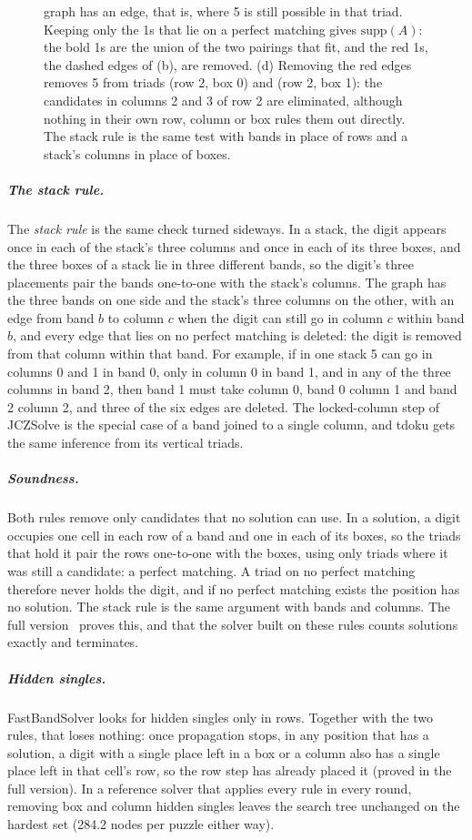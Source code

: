 \documentclass[a4paper,USenglish,cleveref,anonymous]{lipics-v2021}
\newif\ifanon
\newcommand{\selfcite}[1]{\ifanon[anonymized]\else\cite{#1}\fi}
\begin{document}
\begin{figure}[tbp]
{graph has an edge, that is, where 5 is still possible in that triad. Keeping only the 1s that lie on a perfect
matching gives $\mathrm{supp}(A)$: the bold 1s are the union of the two pairings that fit, and the red 1s, the dashed
edges of (b), are removed. (d) Removing the red edges removes 5 from triads (row 2, box 0) and (row 2, box 1): the
candidates in columns 2 and 3 of row 2 are eliminated, although nothing in their own row, column or box rules them
out directly. The stack rule is the same test with bands in place of rows and a stack's
columns in place of boxes.}
\label{fig:band}
\end{figure}

\subparagraph{The stack rule.} The \emph{stack rule} is the same check turned sideways. In a stack, the digit appears once
in each of the stack's three columns and once in each of its three boxes, and the three boxes of a stack lie in three
different bands, so the digit's three placements pair the bands one-to-one with the stack's columns. The graph has the
three bands on one side and the stack's three columns on the other, with an edge from band $b$ to column $c$ when the
digit can still go in column $c$ within band $b$, and every edge that lies on no perfect matching is deleted: the digit
is removed from that column within that band. For example, if in one stack 5 can go in columns 0 and 1 in band 0, only
in column 0 in band 1, and in any of the three columns in band 2, then band 1 must take column 0, band 0 column 1 and
band 2 column 2, and three of the six edges are deleted. The locked-column step of JCZSolve is the special case of a
band joined to a single column, and tdoku gets the same inference from its vertical triads.

\subparagraph{Soundness.} Both rules remove only candidates that no solution can use. In a solution, a digit occupies
one cell in each row of a band and one in each of its boxes, so the triads that hold it pair the rows one-to-one with
the boxes, using only triads where it was still a candidate: a perfect matching. A triad on no perfect matching
therefore never holds the digit, and if no perfect matching exists the position has no solution. The stack rule is the
same argument with bands and columns. The full version~\selfcite{kelly2026full} proves this, and that the solver built on
these rules counts solutions exactly and terminates.

\subparagraph{Hidden singles.} FastBandSolver looks for hidden singles only in rows. Together with the two rules, that
loses nothing: once propagation stops, in any position that has a solution, a digit with a single place left in a box
or a column also has a single place left in that cell's row, so the row step has already placed it (proved in the full
version). In a reference solver that applies every rule in every round, removing box and column hidden singles leaves
the search tree unchanged on the hardest set (284.2 nodes per puzzle either way).
\end{document}
